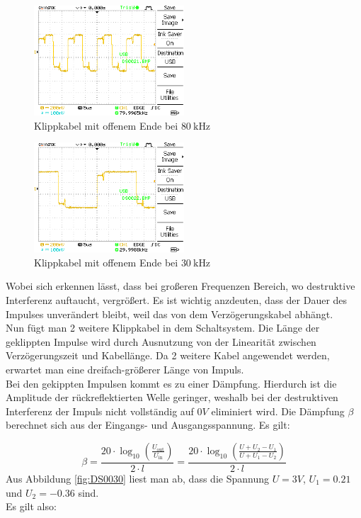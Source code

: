 \documentclass{article}
\begin{document}
				\begin{figure}[H]
					\centering
					\includegraphics[width=0.5\textwidth]{MesswerteVersuch1/DS0021.png}
					\caption{Klippkabel mit offenem Ende bei $\SI{80}{\kilo\hertz}$}
					\label{fig:DS0021}
				\end{figure}
				\begin{figure}[H]
					\centering
					\includegraphics[width=0.5\textwidth]{MesswerteVersuch1/DS0022.png}
					\caption{Klippkabel mit offenem Ende bei $\SI{30}{\kilo\hertz}$}
					\label{fig:DS0021}
				\end{figure}
Wobei sich erkennen lässt, dass bei großeren Frequenzen Bereich,
 wo destruktive Interferenz auftaucht, vergrößert. Es ist wichtig anzdeuten, dass
 der Dauer des Impulses unverändert bleibt, weil das von dem Verzögerungskabel abhängt. \\
 Nun fügt man 2 weitere Klippkabel in dem Schaltsystem. Die Länge der geklippten Impulse wird durch 
 Ausnutzung von der Linearität zwischen Verzögerungszeit und Kabellänge. Da 2 weitere Kabel 
 angewendet werden, erwartet man eine dreifach-größerer Länge von Impuls.
\\
Bei den gekippten Impulsen kommt es zu einer Dämpfung. Hierdurch ist die Amplitude der rückreflektierten 
Welle geringer, weshalb bei der destruktiven Interferenz der Impuls nicht vollständig auf $0V$ eliminiert wird.
Die Dämpfung \( \beta \) berechnet sich aus der Eingangs- und Ausgangsspannung. Es gilt:

\[
\beta = \frac{20 \cdot \log_{10} \left( \frac{U_\text{out}}{U_\text{in}} \right)}{2 \cdot l}
= \frac{20 \cdot \log_{10} \left( \frac{U + U_2 - U_1}{U + U_1 - U_2} \right)}{2 \cdot l}
\]
Aus Abbildung \ref*{fig:DS0030} liest man ab, dass die Spannung $U=3V$, $U_1=0.21$ und $U_2=-0.36$ sind. 
\\ Es gilt also:  
\end{document}

